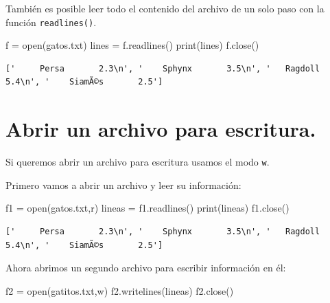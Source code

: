\documentclass[
  spanish,
  letterpaper,
]{scrbook}
\newenvironment{Shaded}{\begin{snugshade}}{\end{snugshade}}
\newcommand{\BuiltInTok}[1]{\textcolor[rgb]{0.00,0.23,0.31}{#1}}
\newcommand{\NormalTok}[1]{\textcolor[rgb]{0.00,0.23,0.31}{#1}}
\newcommand{\OperatorTok}[1]{\textcolor[rgb]{0.37,0.37,0.37}{#1}}
\newcommand{\StringTok}[1]{\textcolor[rgb]{0.13,0.47,0.30}{#1}}
\theoremstyle{definition}
\theoremstyle{remark}
\begin{document}
También es posible leer todo el contenido del archivo de un solo paso
con la función \texttt{readlines()}.

\begin{Shaded}
\begin{Highlighting}[]
\NormalTok{f }\OperatorTok{=} \BuiltInTok{open}\NormalTok{(}\StringTok{\textquotesingle{}gatos.txt\textquotesingle{}}\NormalTok{)}
\NormalTok{lines }\OperatorTok{=}\NormalTok{ f.readlines()}
\BuiltInTok{print}\NormalTok{(lines)}
\NormalTok{f.close()}
\end{Highlighting}
\end{Shaded}

\begin{verbatim}
['     Persa       2.3\n', '    Sphynx       3.5\n', '   Ragdoll       5.4\n', '    SiamÃ©s       2.5']
\end{verbatim}

\section{Abrir un archivo para
escritura.}\label{abrir-un-archivo-para-escritura.}

Si queremos abrir un archivo para escritura usamos el modo \texttt{w}.

Primero vamos a abrir un archivo y leer su información:

\begin{Shaded}
\begin{Highlighting}[]
\NormalTok{f1 }\OperatorTok{=} \BuiltInTok{open}\NormalTok{(}\StringTok{\textquotesingle{}gatos.txt\textquotesingle{}}\NormalTok{,}\StringTok{\textquotesingle{}r\textquotesingle{}}\NormalTok{)}
\NormalTok{lineas }\OperatorTok{=}\NormalTok{ f1.readlines()}
\BuiltInTok{print}\NormalTok{(lineas)}
\NormalTok{f1.close()}
\end{Highlighting}
\end{Shaded}

\begin{verbatim}
['     Persa       2.3\n', '    Sphynx       3.5\n', '   Ragdoll       5.4\n', '    SiamÃ©s       2.5']
\end{verbatim}

Ahora abrimos un segundo archivo para escribir información en él:

\begin{Shaded}
\begin{Highlighting}[]
\NormalTok{f2 }\OperatorTok{=} \BuiltInTok{open}\NormalTok{(}\StringTok{\textquotesingle{}gatitos.txt\textquotesingle{}}\NormalTok{,}\StringTok{\textquotesingle{}w\textquotesingle{}}\NormalTok{)}
\NormalTok{f2.writelines(lineas)}
\NormalTok{f2.close()}
\end{Highlighting}
\end{Shaded}
\end{document}

